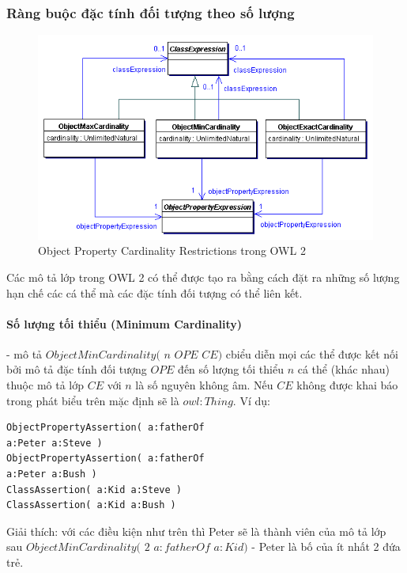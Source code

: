 \subsubsection{Ràng buộc đặc tính đối tượng theo số lượng}
\begin{figure}[h]
	\centering
	\includegraphics[width=120mm]{Figures/ce_2.png}
	\caption{Object Property Cardinality Restrictions trong OWL 2\label{overflow}}
\end{figure}
Các mô tả lớp trong OWL 2 có thể được tạo ra bằng cách đặt ra những số lượng hạn chế các cá thể mà các đặc tính đối tượng có thể liên kết.
\paragraph{Số lượng tối thiểu (Minimum Cardinality)} - mô tả $ ObjectMinCardinality($ $n$ $OPE$  $CE)$ cbiểu diễn mọi các thể được kết nối bởi mô tả đặc tính đối tượng $OPE$ đến số lượng tối thiểu $n$ cá thể (khác nhau) thuộc mô tả lớp $CE$ với $n$ là số nguyên không âm. Nếu $CE$ không được khai báo trong phát biểu trên mặc định sẽ là $owl:Thing$. Ví dụ:
\begin{verbatim}
ObjectPropertyAssertion( a:fatherOf 
a:Peter a:Steve )
ObjectPropertyAssertion( a:fatherOf 
a:Peter a:Bush )
ClassAssertion( a:Kid a:Steve )
ClassAssertion( a:Kid a:Bush )
\end{verbatim}
Giải thích: với các điều kiện như trên thì Peter sẽ là thành viên của mô tả lớp sau 
$ObjectMinCardinality($ $2$ $a:fatherOf$ $a:Kid)$ - Peter là bố của ít nhất 2 đứa trẻ.


